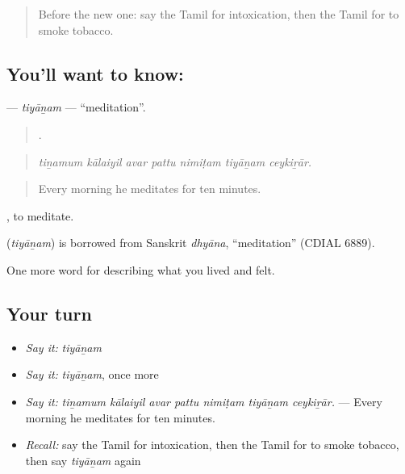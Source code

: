 \label{lesson:TA-C491-tiyanam}



\begin{quote}
Before the new one: say the Tamil for intoxication, then the Tamil for to smoke tobacco.
\end{quote}

\subsection*{You'll want to know: }
\textbf{} — \emph{tiyāṉam} — \textquotedblleft{}meditation\textquotedblright{}.

\begin{quote}
      .
\end{quote}

\begin{quote}
\emph{tiṉamum kālaiyil avar pattu nimiṭam tiyāṉam ceykiṟār.}
\end{quote}

\begin{quote}
Every morning he meditates for ten minutes.
\end{quote}

 , to meditate.

\begin{cousinweb}
\textbf{} (\emph{tiyāṉam}) is borrowed from Sanskrit \emph{dhyāna}, \textquotedblleft{}meditation\textquotedblright{} (CDIAL 6889).
\end{cousinweb}

\begin{grammarlens}[title={What you've built}]
One more word for describing what you lived and felt.
\end{grammarlens}

\subsection*{Your turn}
\begin{itemize}
\raggedright
  \item \emph{Say it:} \emph{tiyāṉam}
  \item \emph{Say it:} \emph{tiyāṉam}, once more
  \item \emph{Say it:} \emph{tiṉamum kālaiyil avar pattu nimiṭam tiyāṉam ceykiṟār.} — Every morning he meditates for ten minutes.
  \item \emph{Recall:} say the Tamil for intoxication, then the Tamil for to smoke tobacco, then say \emph{tiyāṉam} again
\end{itemize}


